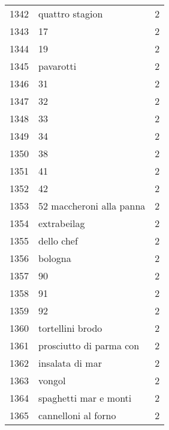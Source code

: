 \begin{tabular}{llr}
1342 &                                    quattro stagion &      2 \\
1343 &                                                 17 &      2 \\
1344 &                                                 19 &      2 \\
1345 &                                          pavarotti &      2 \\
1346 &                                                 31 &      2 \\
1347 &                                                 32 &      2 \\
1348 &                                                 33 &      2 \\
1349 &                                                 34 &      2 \\
1350 &                                                 38 &      2 \\
1351 &                                                 41 &      2 \\
1352 &                                                 42 &      2 \\
1353 &                           52 maccheroni alla panna &      2 \\
1354 &                                        extrabeilag &      2 \\
1355 &                                         dello chef &      2 \\
1356 &                                            bologna &      2 \\
1357 &                                                 90 &      2 \\
1358 &                                                 91 &      2 \\
1359 &                                                 92 &      2 \\
1360 &                                   tortellini brodo &      2 \\
1361 &                            prosciutto di parma con &      2 \\
1362 &                                    insalata di mar &      2 \\
1363 &                                             vongol &      2 \\
1364 &                              spaghetti mar e monti &      2 \\
1365 &                                cannelloni al forno &      2 \\

\end{tabular}

